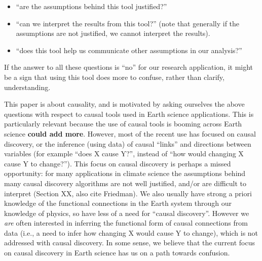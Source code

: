 \documentclass[12pt]{article}
\begin{document}
\begin{itemize}
\item ``are the assumptions behind this tool justified?''
\item ``can we interpret the results from this tool?'' (note that
  generally if the assumptions are not justified, we cannot interpret
  the results).
\item ``does this tool help us communicate other assumptions in our analysis?''
\end{itemize}

If the answer to all these questions is ``no'' for our research
application, it might be a sign that using this tool does more to
confuse, rather than clarify, understanding.

This paper is about causality, and is motivated by asking ourselves
the above questions with respect to causal tools used in Earth science
applications. This is particularly relevant because the use of causal
tools is booming across Earth science
\citep[e.g.,][]{ebert-uphoff2012,
  samarasinghe-casuality,runge-causal-timeseries,runge2019inferring,goodwell-causality-2020}
\textbf{could add more}. However, most of the recent use has focused
on causal discovery, or the inference (using data) of causal ``links''
and directions between variables (for example ``does X cause Y?'',
instead of ``how would changing X cause Y to change?''). This focus on
causal discovery is perhaps a missed opportunity: for many
applications in climate science the assumptions behind many causal
discovery algorithms are not well justified, and/or are difficult to
interpret (Section XX, also cite Friedman). We also usually have
strong a priori knowledge of the functional connections in the Earth
system through our knowledge of physics, so have less of a need for
``causal discovery''. However we \textit{are} often interested in
inferring the functional form of causal connections from data (i.e., a
need to infer how changing X would cause Y to change), which is not
addressed with causal discovery. In some sense, we believe that the
current focus on causal discovery in Earth science has us on a path
towards confusion.
\end{document}
